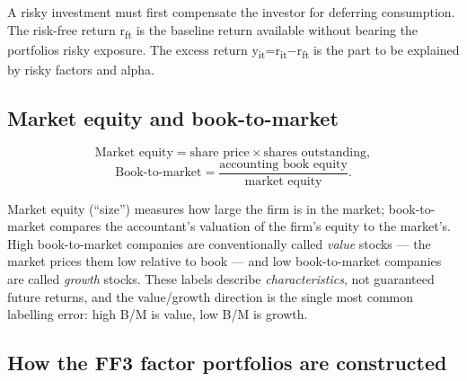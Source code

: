 A risky investment must first compensate the investor for deferring
consumption. The risk-free return r\textsubscript{ft} is the baseline
return available without bearing the portfolio\textquotesingle s risky
exposure. The excess return
y\textsubscript{it}=r\textsubscript{it}\ensuremath{-}r\textsubscript{ft} is the part
to be explained by risky factors and alpha.

\hypertarget{market-equity-and-book-to-market}{%
\subsection{Market equity and
book-to-market}\label{market-equity-and-book-to-market}}

\begin{equation}
\text{Market equity} = \text{share price} \times \text{shares outstanding},
\end{equation}
\begin{equation}
\text{Book-to-market} = \frac{\text{accounting book equity}}{\text{market equity}}.
\end{equation}

Market equity (``size'') measures how large the firm is in the market;
book-to-market compares the accountant's valuation of the firm's equity to
the market's. High book-to-market companies are conventionally called
\emph{value} stocks --- the market prices them low relative to book --- and
low book-to-market companies are called \emph{growth} stocks. These labels
describe \emph{characteristics}, not guaranteed future returns, and the
value/growth direction is the single most common labelling error: high
B/M is value, low B/M is growth.

\hypertarget{how-the-ff3-factor-portfolios-are-constructed}{%
\subsection{How the FF3 factor portfolios are
constructed}\label{how-the-ff3-factor-portfolios-are-constructed}}

